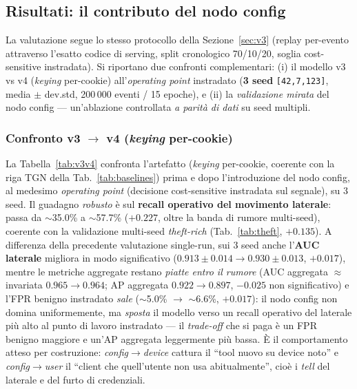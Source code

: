 \documentclass[11pt,a4paper]{report}
\begin{document}
\subsection{Risultati: il contributo del nodo config}
\label{sec:v4results}

La valutazione segue lo stesso protocollo della Sezione~\ref{sec:v3} (replay per-evento attraverso l'esatto codice di serving, split cronologico 70/10/20, soglia cost-sensitive instradata). Si riportano due confronti complementari: (i) il modello v3 vs v4 (\textit{keying} per-cookie) all'\textit{operating point} instradato (\textbf{3 seed} \texttt{[42,7,123]}, media $\pm$ dev.std, 200\,000 eventi / 15 epoche), e (ii) la \emph{validazione mirata} del nodo config — un'ablazione controllata \emph{a parità di dati} su seed multipli.

\subsubsection{Confronto v3 $\rightarrow$ v4 (\textit{keying} per-cookie)}

La Tabella~\ref{tab:v3v4} confronta l'artefatto (\textit{keying} per-cookie, coerente con la riga TGN della Tab.~\ref{tab:baselines}) prima e dopo l'introduzione del nodo config, al medesimo \textit{operating point} (decisione cost-sensitive instradata sul segnale), su 3 seed. Il guadagno \emph{robusto} è sul \textbf{recall operativo del movimento laterale}: passa da $\sim$35.0\% a $\sim$57.7\% ($+0.227$, oltre la banda di rumore multi-seed), coerente con la validazione multi-seed \textit{theft-rich} (Tab.~\ref{tab:theft}, $+0.135$). A differenza della precedente valutazione single-run, sui 3 seed anche l'\textbf{AUC laterale} migliora in modo significativo ($0.913\pm0.014\rightarrow0.930\pm0.013$, $+0.017$), mentre le metriche aggregate restano \emph{piatte entro il rumore} (AUC aggregata $\approx$invariata $0.965\rightarrow0.964$; AP aggregata $0.922\rightarrow0.897$, $-0.025$ non significativo) e l'FPR benigno instradato \emph{sale} ($\sim$5.0\% $\rightarrow$ $\sim$6.6\%, $+0.017$): il nodo config non domina uniformemente, ma \emph{sposta} il modello verso un recall operativo del laterale più alto al punto di lavoro instradato --- il \textit{trade-off} che si paga è un FPR benigno maggiore e un'AP aggregata leggermente più bassa. È il comportamento atteso per costruzione: \textit{config}$\rightarrow$\textit{device} cattura il ``tool nuovo su device noto'' e \textit{config}$\rightarrow$\textit{user} il ``client che quell'utente non usa abitualmente'', cioè i \textit{tell} del laterale e del furto di credenziali.
\end{document}
